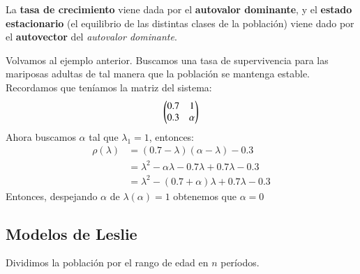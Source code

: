 \begin{obs}
    La \textbf{tasa de crecimiento} viene dada por el \textbf{autovalor dominante}, y el \textbf{estado estacionario} (el equilibrio de las distintas clases de la población) viene dado por el \textbf{autovector} del \textit{autovalor dominante}.
\end{obs}

Volvamos al ejemplo anterior. Buscamos una tasa de supervivencia para las mariposas adultas de tal manera que la población se mantenga estable. Recordamos que teníamos la matriz del sistema:
$$
\px{0.7 & 1\\ 0.3 & \alpha}
$$
Ahora buscamos $\alpha$ tal que $\lambda_1 = 1$, entonces:
\begin{align*}
    \rho(\lambda) &= (0.7 - \lambda)(\alpha - \lambda) - 0.3\\
     &= \lambda^2 - \alpha \lambda - 0.7\lambda + 0.7\lambda - 0.3\\
     &= \lambda^2 - (0.7 + \alpha)\lambda + 0.7\lambda -0.3
\end{align*}
Entonces, despejando $\alpha$ de $\lambda(\alpha)=1$ obtenemos que $\alpha=0$

\subsection{Modelos de Leslie}
Dividimos la población por el rango de edad en $n$ períodos.


